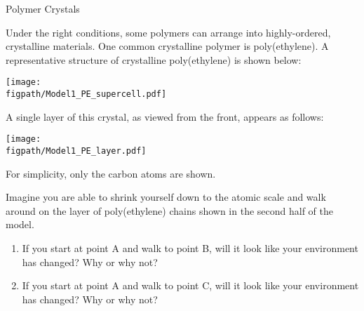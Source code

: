 \begin{activity}{Polymer Crystals}
\begin{instructornotes}
\end{instructornotes}


\begin{model}
	\label{\labelbase:mdl:crystalstructs}
	
	Under the right conditions, some polymers can arrange into highly-ordered, crystalline materials. One common crystalline polymer is poly(ethylene).  A representative structure of crystalline poly(ethylene) is shown below:
	
	\vspace{6pt}
	\centerline{\texttt{[image: \\figpath/Model1\_PE\_supercell.pdf]}}	
	
	
	A single layer of this crystal, as viewed from the front, appears as follows:
	
	\vspace{6pt}
	\centerline{\texttt{[image: \\figpath/Model1\_PE\_layer.pdf]}}	
	
	For simplicity, only the carbon atoms are shown.
	
\end{model}


\begin{ctqs}

%	

	\question Imagine you are able to shrink yourself down to the atomic scale and walk around on the layer of poly(ethylene) chains shown in the second half of the model.
	
		\begin{enumerate}
			\item If you start at point A and walk to point B, will it look like your environment has changed?  Why or why not?
	
		\begin{solution}[0.75in]
		\end{solution}
			
			\item If you start at point A and walk to point C, will it look like your environment has changed?  Why or why not?
	

\end{enumerate}
\end{ctqs}
\end{activity}
